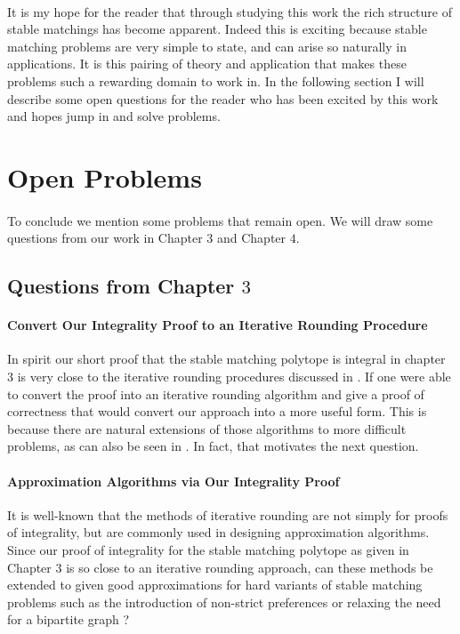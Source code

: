 \paragraph{}
It is my hope for the reader that through studying this work the rich structure of stable matchings has become apparent. Indeed this is exciting because stable matching problems are very simple to state, and can arise so naturally in applications. It is this pairing of theory and application that makes these problems such a rewarding domain to work in. In the following section I will describe some open questions for the reader who has been excited by this work and hopes jump in and solve problems. 

\section{Open Problems}

\paragraph{}
To conclude we mention some problems that remain open. We will draw some questions from our work in Chapter $3$ and Chapter $4$.
\subsection{Questions from Chapter $3$}

\paragraph{Convert Our Integrality Proof to an Iterative Rounding Procedure}
In spirit our short proof that the stable matching polytope is integral in chapter 3 is very close to the iterative rounding procedures discussed in \cite{lau2011iterative}. If one were able to convert the proof into an iterative rounding algorithm and give a proof of correctness that would convert our approach into a more useful form. This is because there are natural extensions of those algorithms to more difficult problems, as can also be seen in \cite{lau2011iterative}. In fact, that motivates the next question.

\paragraph{Approximation Algorithms via Our Integrality Proof}
It is well-known that the methods of iterative rounding are not simply for proofs of integrality, but are commonly used in designing approximation algorithms\cite{lau2011iterative}. Since our proof of integrality for the stable matching polytope as given in Chapter $3$ is so close to an iterative rounding approach, can these methods be extended to given good approximations for hard variants of stable matching problems such as the introduction of non-strict preferences or relaxing the need for a bipartite graph \cite{iwama2008survey}?

